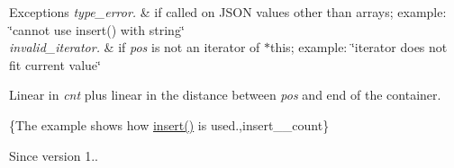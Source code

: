 \begin{DoxyExceptions}{Exceptions}
{\em type\+\_\+error.} & if called on J\+S\+ON values other than arrays; example\+: {\ttfamily \char`\"{}cannot use insert() with string\char`\"{}} \\
\hline
{\em invalid\+\_\+iterator.} & if {\itshape pos} is not an iterator of $\ast$this; example\+: {\ttfamily \char`\"{}iterator does not fit current value\char`\"{}}\\
\hline
\end{DoxyExceptions}
Linear in {\itshape cnt} plus linear in the distance between {\itshape pos} and end of the container.

\{The example shows how {\ttfamily \mbox{\hyperlink{classnlohmann_1_1basic__json_a0136728f5db69d4051c77b94307abd6c}{insert()}}} is used.,insert\+\_\+\+\_\+count\}

\begin{DoxySince}{Since}
version 1.. 
\end{DoxySince}
\mbox{\label{classnlohmann_1_1basic__json_a404cfe1bdbf1dc6b229627fcf2afb95f}} 
